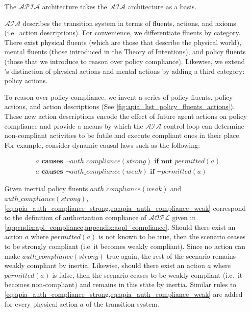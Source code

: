 The $\mathcal{APIA}$ architecture takes the $\mathcal{AIA}$ architecture as a basis.

$\mathcal{AIA}$ describes the transition system in terms of fluents, actions, and axioms (i.e.~action descriptions).
For convenience, we differentiate fluents by category.
There exist physical fluents (which are those that describe the physical world), mental fluents (those introduced in the Theory of Intentions), and policy fluents (those that we introduce to reason over policy compliance).
Likewise, we extend \citet{blount_architecture_2013,blount_towards_2014}'s distinction of physical actions and mental actions by adding a third category: policy actions.

To reason over policy compliance, we invent a series of policy fluents, policy actions, and action descriptions (See \cref{fig:apia_list_policy_fluents_actions}).
These new action descriptions encode the effect of future agent actions on policy compliance and provide a means by which the $\mathcal{AIA}$ control loop can determine non-compliant activities to be futile and execute compliant ones in their place.
For example, consider dynamic causal laws such as the following:

\begin{gather}
    a \textbf{ causes } \neg auth\_compliance(strong) \textbf{ if not } permitted(a)
        \label{eq:apia_auth_compliance_strong} \\
    a \textbf{ causes } \neg auth\_compliance(weak) \textbf{ if } \neg permitted(a)
        \label{eq:apia_auth_compliance_weak}
\end{gather}

Given inertial policy fluents $auth\_compliance(weak)$ and $auth\_compliance(strong)$, \cref{eq:apia_auth_compliance_strong,eq:apia_auth_compliance_weak} correspond to the definition of authorization compliance of $\mathcal{AOPL}$ given in \cref{appendix:apl_compliance,appendix:aopl_compliance}.
Should there exist an action $a$ where $permitted(a)$ is not known to be true, then the scenario ceases to be strongly compliant (i.e~it becomes weakly compliant).
Since no action can make $auth\_compliance(strong)$ true again, the rest of the scenario remains weakly compliant by inertia.
Likewise, should there exist an action $a$ where $permitted(a)$ is false, then the scenario ceases to be weakly compliant (i.e.~it becomes non-compliant) and remains in this state by inertia.
Similar rules to \cref{eq:apia_auth_compliance_strong,eq:apia_auth_compliance_weak} are added for every physical action $a$ of the transition system.

